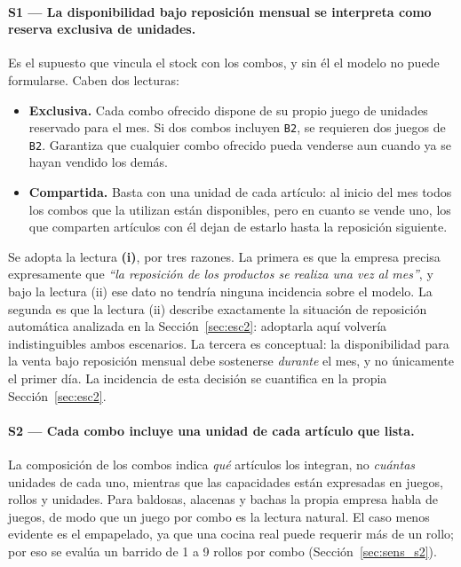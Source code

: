 \documentclass[10pt,a4paper]{article}
\newcommand{\art}[1]{\texttt{#1}}
\newcommand{\cita}[1]{\emph{``#1''}}
\begin{document}
\paragraph{S1 — La disponibilidad bajo reposición mensual se interpreta como
reserva exclusiva de unidades.} Es el supuesto que vincula el stock con los
combos, y sin él el modelo no puede formularse. Caben dos lecturas:

\begin{itemize}
  \item[(i)] \textbf{Exclusiva.} Cada combo ofrecido dispone de su propio juego
  de unidades reservado para el mes. Si dos combos incluyen \art{B2}, se
  requieren dos juegos de \art{B2}. Garantiza que cualquier combo ofrecido pueda
  venderse aun cuando ya se hayan vendido los demás.
  \item[(ii)] \textbf{Compartida.} Basta con una unidad de cada artículo: al
  inicio del mes todos los combos que la utilizan están disponibles, pero en
  cuanto se vende uno, los que comparten artículos con él dejan de estarlo hasta
  la reposición siguiente.
\end{itemize}

Se adopta la lectura \textbf{(i)}, por tres razones. La primera es que la
empresa precisa expresamente que \cita{la reposición de los productos se realiza
una vez al mes}, y bajo la lectura (ii) ese dato no tendría ninguna incidencia
sobre el modelo. La segunda es que la lectura (ii) describe exactamente la
situación de reposición automática analizada en la Sección~\ref{sec:esc2}:
adoptarla aquí volvería indistinguibles ambos escenarios. La tercera es
conceptual: la disponibilidad para la venta bajo reposición mensual debe
sostenerse \emph{durante} el mes, y no únicamente el primer día. La incidencia
de esta decisión se cuantifica en la propia Sección~\ref{sec:esc2}.

\paragraph{S2 — Cada combo incluye una unidad de cada artículo que lista.} La
composición de los combos indica \emph{qué} artículos los integran, no
\emph{cuántas} unidades de cada uno, mientras que las capacidades están
expresadas en juegos, rollos y unidades. Para baldosas, alacenas y bachas la
propia empresa habla de juegos, de modo que un juego por combo es la lectura
natural. El caso menos evidente es el empapelado, ya que una cocina real puede
requerir más de un rollo; por eso se evalúa un barrido de 1 a 9 rollos por combo
(Sección~\ref{sec:sens_s2}).
\end{document}
